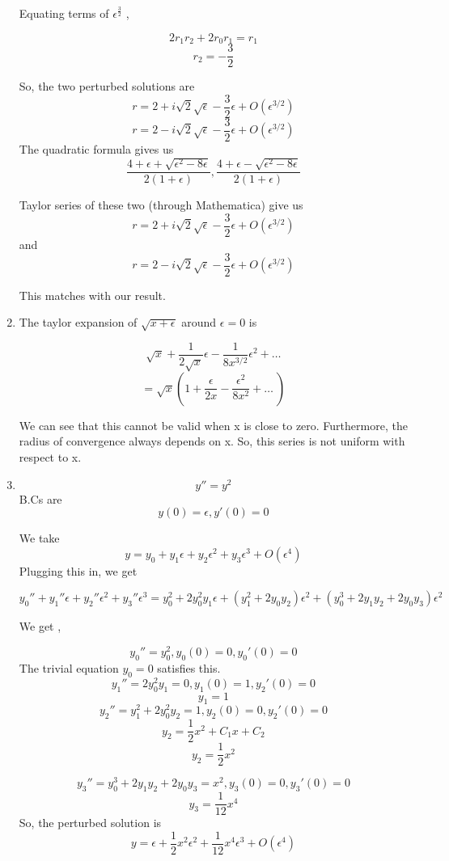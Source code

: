 \documentclass[a4paper]{article}
\begin{document}
\begin{enumerate}
 Equating terms of $\epsilon^{\frac{3}{2}}$ ,
 
 \[2r_1r_2 +2r_0r_1 =r_1 \]
 \[ r_2= -\frac{3}{2}\]
 
 So, the two perturbed solutions are
\[r= 2 +i \sqrt2 \sqrt\epsilon-\frac{3}{2} \epsilon +O(\epsilon^{3/2})\]
\[r= 2 -i \sqrt2 \sqrt\epsilon-\frac{3}{2} \epsilon +O(\epsilon^{3/2})\] 
 The quadratic formula gives us 
 \[ \frac{4+\epsilon + \sqrt{\epsilon^2-8\epsilon}}{2(1+\epsilon)}, \frac{4+\epsilon - \sqrt{\epsilon^2-8\epsilon}}{2(1+\epsilon)}\]
 
Taylor series of these two (through Mathematica) give us 
\[r= 2 +i \sqrt2 \sqrt\epsilon-\frac{3}{2} \epsilon +O(\epsilon^{3/2})\] and 
\[r= 2 -i \sqrt2 \sqrt\epsilon-\frac{3}{2} \epsilon +O(\epsilon^{3/2})\] 

This matches with our result.


\item

The taylor expansion of $\sqrt{x+\epsilon}$ around $\epsilon =0$ is

\[\sqrt x + \frac{1}{2\sqrt x}\epsilon - \frac{1}{8 x^{3/2}}\epsilon^2 +\ldots\]
\[= \sqrt x(1+ \frac{\epsilon}{2x} - \frac{\epsilon^2}{8 x^{2}} +\ldots\ )\]

We can see that this cannot be valid when x is close to zero. Furthermore, the radius of convergence always depends on x. So, this series is not uniform with respect to x. 

\item 
\[y''= y^2 \]
B.Cs are 
\[y(0)=\epsilon, y'(0)=0\]

We take 
\[y = y_0 + y_1 \epsilon +y_2 \epsilon^2 + y_3\epsilon^3+ O(\epsilon^{4})  \]
 Plugging this in, we get
 
 \[ y_0'' + y_1'' \epsilon +y_2'' \epsilon^2 + y_3''\epsilon^3= y_0^2 +2y_0^2y_1\epsilon+ (y_1^2 + 2y_0y_2)\epsilon^2 +(y_0^3+2y_1y_2+2y_0y_3)\epsilon^2 \]

We get ,

\[y_0'' = y_0^2, y_0(0)=0, y_0'(0)=0\]
The trivial equation $y_0 = 0$ satisfies this.
\[y_1'' = 2y_0^2y_1 =0 , y_1(0)=1, y_2'(0)=0\]
\[y_1= 1\]
\[y_2'' =  y_1^2+2y_0^2y_2 =1 , y_2(0)=0, y_2'(0)=0\]
\[y_2= \frac{1}{2}x^2+C_1x +C_2\]
\[y_2= \frac{1}{2} x^2\]

\[y_3'' = y_0^3+2y_1y_2+2y_0y_3 =x^2 , y_3(0)=0, y_3'(0)=0\]
\[y_3= \frac{1}{12}x^4\]
So, the perturbed solution is 
\[ y = \epsilon+ \frac{1}{2} x^2\epsilon^2+ \frac{1}{12} x^4\epsilon^3+O(\epsilon^{4})\]
\end{enumerate}
\end{document}
